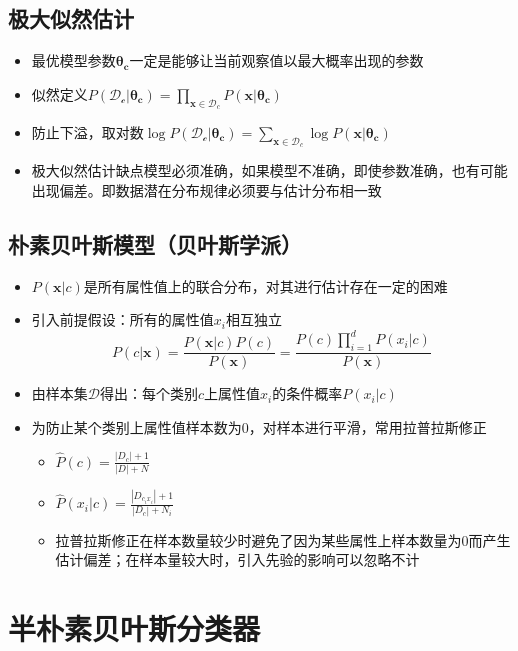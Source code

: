 \subsection{极大似然估计}

\begin{itemize}
\item 最优模型参数$\mathbf{\theta_c}$一定是能够让当前观察值以最大概率出现的参数
\item 似然定义$P(\mathcal{D_c}|\mathbf{\theta_c})=\prod_{\mathbf{x}\in\mathcal{D}_c}P(\mathbf{x}|\mathbf{\theta_c})$
\item 防止下溢，取对数$\log P(\mathcal{D_c}|\mathbf{\theta_c})=\sum_{\mathbf{x}\in\mathcal{D}_c}\log P(\mathbf{x}|\mathbf{\theta_c})$
\item 极大似然估计缺点模型必须准确，如果模型不准确，即使参数准确，也有可能出现偏差。即数据潜在分布规律必须要与估计分布相一致
\end{itemize}

\subsection{朴素贝叶斯模型（贝叶斯学派）}

\begin{itemize}
\item $P(\mathbf{x}|c)$是所有属性值上的联合分布，对其进行估计存在一定的困难
\item 引入前提假设：所有的属性值$x_i$相互独立$$P(c|\mathbf{x})=\frac{P(\mathbf{x}|c)P(c)}{P(\mathbf{x})}=\frac{P(c)\prod_{i=1}^dP(x_i|c)}{P(\mathbf{x})}$$
\item 由样本集$\mathcal{D}$得出：每个类别$c$上属性值$x_i$的条件概率$P(x_i|c)$
\item 为防止某个类别上属性值样本数为0，对样本进行平滑，常用拉普拉斯修正
    \begin{itemize}
    \item $\widehat{P}(c)=\frac{|D_c|+1}{|D|+N}$
    \item $\widehat{P}(x_i|c)=\frac{|D_{c_ix_i}|+1}{|D_c|+N_i}$
    \item 拉普拉斯修正在样本数量较少时避免了因为某些属性上样本数量为0而产生估计偏差；在样本量较大时，引入先验的影响可以忽略不计
    \end{itemize}
\end{itemize}

\section{半朴素贝叶斯分类器}


